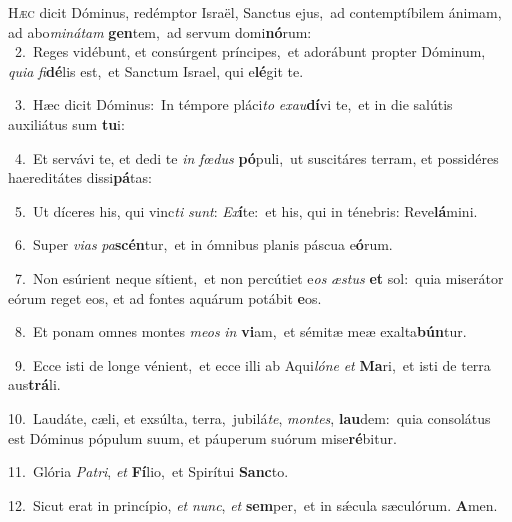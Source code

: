 \lettrine{\initial\textcolor{\initialcolor}{H}}{æc} dicit Dóminus, redémptor Israël, Sanctus ejus,~\dagger ad contemptíbilem ánimam, ad abo\-\textit{mi}\-\textit{ná}\textit{tam} \textbf{gen}\-tem,~\star ad servum domi\-\textbf{nó}\-rum:\\
{\numbfont\textcolor{\numbcolor}{~2.}}~Reges vidébunt, et consúrgent príncipes,~\dagger et adorábunt propter Dóminum, \textit{qui}\-\textit{a} \textit{fi}\-\textbf{dé}lis est,~\star et Sanctum Israel, qui e\-\textbf{lé}\-git te.\par
{\numbfont\textcolor{\numbcolor}{~3.}}~Hæc dicit Dóminus:~\dagger In témpore pláci\textit{to} \textit{ex}\-\textit{au}\textbf{dí}vi te,~\star et in die salútis auxiliátus sum \textbf{tu}\-i:\par
{\numbfont\textcolor{\numbcolor}{~4.}}~Et servávi te, et dedi te \textit{in} \textit{fœ}\-\textit{dus} \textbf{pó}\-puli,~\star ut suscitáres terram, et possidéres haereditátes dissi\-\textbf{pá}\-tas:\par
{\numbfont\textcolor{\numbcolor}{~5.}}~Ut díceres his, qui vinc\textit{ti} \textit{sunt}\-: \textit{Ex}\-\textbf{í}te:~\star et his, qui in ténebris: Reve\-\textbf{lá}\-mini.\par
{\numbfont\textcolor{\numbcolor}{~6.}}~Super \textit{vi}\-\textit{as} \textit{pa}\-\textbf{scén}tur,~\star et in ómnibus planis páscua e\-\textbf{ó}\-rum.\par
{\numbfont\textcolor{\numbcolor}{~7.}}~Non esúrient neque sítient,~\dagger et non percútiet e\textit{os} \textit{æs}\-\textit{tus} \textbf{et} sol:~\star quia miserátor eórum reget eos, et ad fontes aquárum potábit \textbf{e}\-os.\par
{\numbfont\textcolor{\numbcolor}{~8.}}~Et ponam omnes montes \textit{me}\-\textit{os} \textit{in} \textbf{vi}\-am,~\star et sémitæ meæ exalta\-\textbf{bún}\-tur.\par
{\numbfont\textcolor{\numbcolor}{~9.}}~Ecce isti de longe vénient,~\dagger et ecce illi ab Aqui\-\textit{ló}\-\textit{ne} \textit{et} \textbf{Ma}\-ri,~\star et isti de terra aus\-\textbf{trá}\-li.\par
{\numbfont\textcolor{\numbcolor}{10.}}~Laudáte, cæli, et exsúlta, terra,~\dagger jubilá\-\textit{te}\-, \textit{mon}\-\textit{tes}, \textbf{lau}\-dem:~\star quia consolátus est Dóminus pópulum suum, et páuperum suórum mise\-\textbf{ré}\-bitur.\par
{\numbfont\textcolor{\numbcolor}{11.}}~Glória \textit{Pa}\-\textit{tri}, \textit{et} \textbf{Fí}\-lio,~\star et Spirítui \textbf{Sanc}\-to.\par
{\numbfont\textcolor{\numbcolor}{12.}}~Sicut erat in princípio, \textit{et} \textit{nunc}\-, \textit{et} \textbf{sem}\-per,~\star et in sǽcula sæculórum. \textbf{A}\-men.\par
